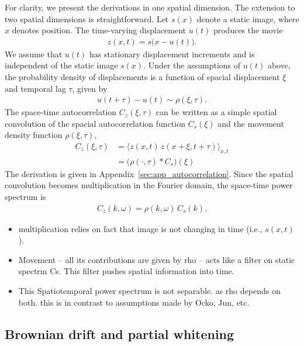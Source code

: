 \documentclass[12pt]{article}
\newcommand{\afbcomment}[1]{\textcolor{alexcolor}{#1}}
\begin{document}
For clarity, we present the derivations in one spatial dimension. The extension to two spatial dimensions is straightforward. Let $s(x)$ denote a static image, where $x$ denotes position. The time-varying displacement $u(t)$ produces the movie
\begin{align}
    z(x,t) = s\big(x-u(t)\big).
\end{align}
We assume that $u(t)$ has stationary displacement increments and is independent of the static image $s(x)$. 
Under the assumptions of $u(t)$ above, the probability density of displacements is a function of spacial displacement $\xi$ and temporal lag $\tau$, given by
\begin{align}
    u(t+\tau) - u(t) \sim \rho(\xi,\tau).
\end{align}
The space-time autocorrelation $C_z(\xi,\tau)$ can be written as a simple spatial convolution of the spacial autocorrelation function $C_s(\xi)$ and the movement density function $\rho(\xi,\tau)$,
\begin{align}
    C_z(\xi,\tau) &= \big\langle z(x, t) \, z(x+\xi,t+\tau)\big\rangle_{x,t} \\
        &= \big(\rho(\cdot,\tau) * C_s\big)(\xi)
\end{align}
The derivation is given in Appendix~\ref{sec:app_autocorrelation}. Since the spatial convolution becomes multiplication in the Fourier domain, the space-time power spectrum is
\begin{align}
    C_z(k,\omega) =  \rho(k,\omega)\, C_s(k).
\end{align}


\afbcomment{
\begin{itemize}
    \item multiplication relies on fact that image is not changing in time (i.e., $s(x,t)$).
    \item Movement -- all its contributions are given by rho -- acts like a filter on static spectrm Cs. This filter pushes spatial information into time. %
    \item This Spatiotemporal power spectrum is not separable. as rho depends on both. this is in contrast to assumptions made by Ocko, Jun, etc. 
\end{itemize}
}

\subsection{Brownian drift and partial whitening}
\end{document}
